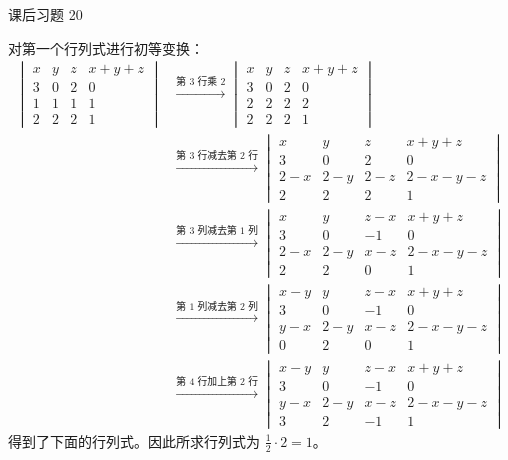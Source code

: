 \begin{problem}
	课后习题 20
	\begin{solution}
		对第一个行列式进行初等变换：
		$$
		\begin{aligned}
			\begin{vmatrix}
				x & y & z & x + y + z \\
				3 & 0 & 2 & 0 \\
				1 & 1 & 1 & 1 \\
				2 & 2 & 2 & 1
			\end{vmatrix} & \xrightarrow{\text{第 $3$ 行乘 $2$}} \begin{vmatrix}
				x & y & z & x + y + z \\
				3 & 0 & 2 & 0 \\
				2 & 2 & 2 & 2 \\
				2 & 2 & 2 & 1
			\end{vmatrix} \\
			& \xrightarrow{\text{第 $3$ 行减去第 $2$ 行}} \begin{vmatrix}
				x & y & z & x + y + z \\
				3 & 0 & 2 & 0 \\
				2 - x & 2 - y & 2 - z & 2 - x - y - z \\
				2 & 2 & 2 & 1
			\end{vmatrix} \\
			& \xrightarrow{\text{第 $3$ 列减去第 $1$ 列}} \begin{vmatrix}
				x & y & z - x & x + y + z \\
				3 & 0 & -1 & 0 \\
				2 - x & 2 - y & x - z & 2 - x - y - z \\
				2 & 2 & 0 & 1
			\end{vmatrix} \\
			& \xrightarrow{\text{第 $1$ 列减去第 $2$ 列}} \begin{vmatrix}
				x - y & y & z - x & x + y + z \\
				3 & 0 & -1 & 0 \\
				y - x & 2 - y & x - z & 2 - x - y - z \\
				0 & 2 & 0 & 1
			\end{vmatrix} \\
			& \xrightarrow{\text{第 $4$ 行加上第 $2$ 行}} \begin{vmatrix}
				x - y & y & z - x & x + y + z \\
				3 & 0 & -1 & 0 \\
				y - x & 2 - y & x - z & 2 - x - y - z \\
				3 & 2 & -1 & 1
			\end{vmatrix}
		\end{aligned}
		$$
		得到了下面的行列式。因此所求行列式为 $\frac{1}{2} \cdot 2 = 1$。
	\end{solution}
\end{problem}

